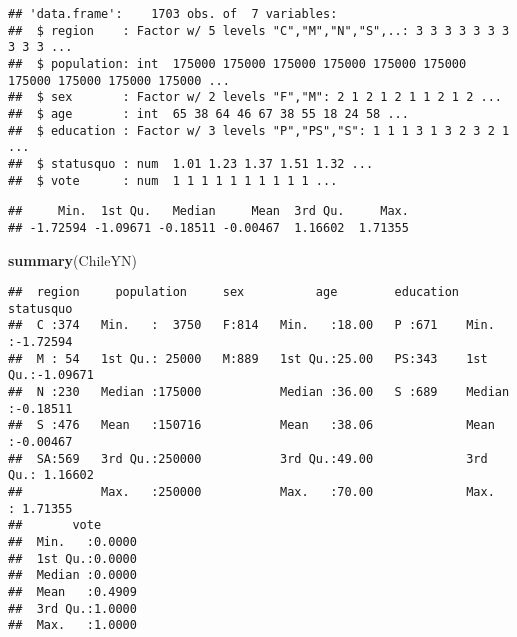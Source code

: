\documentclass[]{article}
\newenvironment{Shaded}{\begin{snugshade}}{\end{snugshade}}
\newcommand{\CommentTok}[1]{\textcolor[rgb]{0.56,0.35,0.01}{\textit{#1}}}
\newcommand{\DecValTok}[1]{\textcolor[rgb]{0.00,0.00,0.81}{#1}}
\newcommand{\KeywordTok}[1]{\textcolor[rgb]{0.13,0.29,0.53}{\textbf{#1}}}
\newcommand{\NormalTok}[1]{#1}
\newcommand{\OperatorTok}[1]{\textcolor[rgb]{0.81,0.36,0.00}{\textbf{#1}}}
\newcommand{\StringTok}[1]{\textcolor[rgb]{0.31,0.60,0.02}{#1}}
\begin{document}
\begin{Shaded}
\end{Shaded}

\begin{verbatim}
## 'data.frame':    1703 obs. of  7 variables:
##  $ region    : Factor w/ 5 levels "C","M","N","S",..: 3 3 3 3 3 3 3 3 3 3 ...
##  $ population: int  175000 175000 175000 175000 175000 175000 175000 175000 175000 175000 ...
##  $ sex       : Factor w/ 2 levels "F","M": 2 1 2 1 2 1 1 2 1 2 ...
##  $ age       : int  65 38 64 46 67 38 55 18 24 58 ...
##  $ education : Factor w/ 3 levels "P","PS","S": 1 1 1 3 1 3 2 3 2 1 ...
##  $ statusquo : num  1.01 1.23 1.37 1.51 1.32 ...
##  $ vote      : num  1 1 1 1 1 1 1 1 1 1 ...
\end{verbatim}

\begin{Shaded}
\end{Shaded}

\begin{verbatim}
##     Min.  1st Qu.   Median     Mean  3rd Qu.     Max. 
## -1.72594 -1.09671 -0.18511 -0.00467  1.16602  1.71355
\end{verbatim}

\begin{Shaded}
\begin{Highlighting}[]
\KeywordTok{summary}\NormalTok{(ChileYN)}
\end{Highlighting}
\end{Shaded}

\begin{verbatim}
##  region     population     sex          age        education   statusquo       
##  C :374   Min.   :  3750   F:814   Min.   :18.00   P :671    Min.   :-1.72594  
##  M : 54   1st Qu.: 25000   M:889   1st Qu.:25.00   PS:343    1st Qu.:-1.09671  
##  N :230   Median :175000           Median :36.00   S :689    Median :-0.18511  
##  S :476   Mean   :150716           Mean   :38.06             Mean   :-0.00467  
##  SA:569   3rd Qu.:250000           3rd Qu.:49.00             3rd Qu.: 1.16602  
##           Max.   :250000           Max.   :70.00             Max.   : 1.71355  
##       vote       
##  Min.   :0.0000  
##  1st Qu.:0.0000  
##  Median :0.0000  
##  Mean   :0.4909  
##  3rd Qu.:1.0000  
##  Max.   :1.0000
\end{verbatim}
\end{document}
